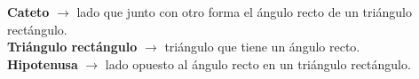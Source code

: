 \begin{defcard}
    \textbf{Cateto} $\rightarrow$ lado que junto con otro forma el ángulo recto de un triángulo rectángulo.\\
    \textbf{Triángulo rectángulo} $\rightarrow$ triángulo que tiene un ángulo recto.\\
    \textbf{Hipotenusa} $\rightarrow$ lado opuesto al ángulo recto en un triángulo rectángulo.
\end{defcard}